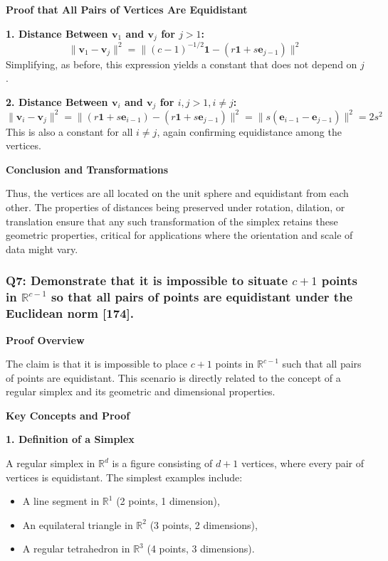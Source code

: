\documentclass[8pt]{article}
\begin{document}
{\textbf{Proof that All Pairs of Vertices Are Equidistant}

\textbf{1. Distance Between \( \mathbf{v}_1 \) and \( \mathbf{v}_j \) for \( j > 1 \):}
   \[
   \|\mathbf{v}_1 - \mathbf{v}_j\|^2 = \| (c - 1)^{-1/2} \mathbf{1} - (r \mathbf{1} + s \mathbf{e}_{j-1}) \|^2
   \]
   Simplifying, as before, this expression yields a constant that does not depend on \(j\).

\textbf{2. Distance Between \( \mathbf{v}_i \) and \( \mathbf{v}_j \) for \( i, j > 1, i \neq j \):}
   \[
   \|\mathbf{v}_i - \mathbf{v}_j\|^2 = \|(r \mathbf{1} + s \mathbf{e}_{i-1}) - (r \mathbf{1} + s \mathbf{e}_{j-1})\|^2 = \|s (\mathbf{e}_{i-1} - \mathbf{e}_{j-1})\|^2 = 2s^2
   \]
   This is also a constant for all \(i \neq j\), again confirming equidistance among the vertices.

\textbf{Conclusion and Transformations}

Thus, the vertices are all located on the unit sphere and equidistant from each other. The properties of distances being preserved under rotation, dilation, or translation ensure that any such transformation of the simplex retains these geometric properties, critical for applications where the orientation and scale of data might vary.

\subsubsection*{Q7: Demonstrate that it is impossible to situate \(c + 1\) points in \(\mathbb{R}^{c-1}\) so that all pairs of points are equidistant under the Euclidean norm [174].}

\textbf{Proof Overview}

The claim is that it is impossible to place \(c + 1\) points in \(\mathbb{R}^{c-1}\) such that all pairs of points are equidistant. This scenario is directly related to the concept of a regular simplex and its geometric and dimensional properties.

\textbf{Key Concepts and Proof}

\textbf{1. Definition of a Simplex}

A regular simplex in \( \mathbb{R}^d \) is a figure consisting of \( d + 1 \) vertices, where every pair of vertices is equidistant. The simplest examples include:
\begin{itemize}
    \item A line segment in \( \mathbb{R}^1 \) (2 points, 1 dimension),
    \item An equilateral triangle in \( \mathbb{R}^2 \) (3 points, 2 dimensions),
    \item A regular tetrahedron in \( \mathbb{R}^3 \) (4 points, 3 dimensions).
\end{itemize}

}
\end{document}
